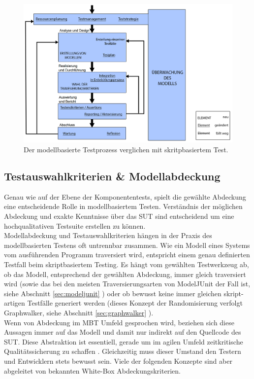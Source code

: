 \begin{figure}[h] 
  \centering
     \includegraphics[width=1.1\textwidth]{figures/mbt_vergleich_skript.png}
  \caption{Der modellbasierte Testprozess verglichen mit skritpbasiertem Test.}
  \label{fig:script_vs_mbt}
\end{figure}

\subsection{Testauswahlkriterien \& Modellabdeckung}
\label{sec:coverage}

Genau wie auf der Ebene der Komponententests, spielt die gewählte Abdeckung eine entscheidende Rolle in modellbasiertem Testen. Verständnis der möglichen Abdeckung und exakte Kenntnisse über das \Gls{SUT} sind entscheidend um eine hochqualitativen Testsuite erstellen zu können.\\
Modellabdeckung und Testauswahlkriterien hängen in der Praxis des modellbasierten Testens oft untrennbar zusammen. Wie ein Modell eines Systems vom ausführenden Programm traversiert wird, entspricht einem genau definierten Testfall beim skriptbasiertem Testing. Es hängt vom gewählten Testwerkzeug ab, ob das Modell, entsprechend der gewählten Abdeckung, immer gleich traversiert wird (sowie das bei den meisten Traversierungsarten von ModelJUnit der Fall ist, siehe Abschnitt \ref{sec:modeljunit} ) oder ob bewusst keine immer gleichen skript-artigen Testfälle generiert werden (dieses Konzept der Randomisierung verfolgt Graphwalker, siehe Abschnitt \ref{sec:graphwalker} ).\\
Wenn von Abdeckung im \Gls{MBT} Umfeld gesprochen wird, beziehen sich diese Aussagen immer auf das Modell und damit nur indirekt auf den Quellcode des \Gls{SUT}. Diese Abstraktion ist essentiell, gerade um im agilen Umfeld zeitkritische Qualitätssicherung zu schaffen \cite{utting_practical_2007}. Gleichzeitig muss dieser Umstand den Testern und Entwicklern stets bewusst sein. Viele der folgenden Konzepte sind aber abgeleitet von bekannten White-Box Abdeckungskriterien.

